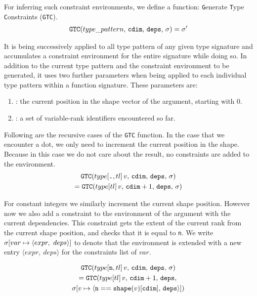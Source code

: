 \noindent
For inferring such constraint environments, we define a function: \texttt{G}enerate \texttt{T}ype \texttt{C}onstraints (\texttt{GTC}).
\begin{gather*}
    \texttt{GTC}(type\_pattern,\, \texttt{cdim},\, \texttt{deps},\, \sigma{}) = \sigma{}'
\end{gather*}

\noindent
It is being successively applied to all type pattern of any given type signature and accumulates a constraint environment \cenv{} for the entire signature
while doing so.
In addition to the current type pattern and the constraint environment to be generated,
it uses two further parameters when
being applied to each individual type pattern within a function signature.
These parameters are:
\begin{enumerate}
    \item \cdim{}: the current position in the shape vector of the argument, starting with 0.
    \item \deps{}: a set of variable-rank identifiers encountered so far.
\end{enumerate}

\noindent
Following are the recursive cases of the \texttt{GTC} function.
In the case that we encounter a dot, we only need to increment the current position in the shape.
Because in this case we do not care about the result, no constraints are added to the environment.
\begin{gather*}
    \texttt{GTC}(type[\texttt{\textbf{.}},tl]\,v,\,\texttt{cdim},\,\texttt{deps},\,\sigma{}) \\
        = \texttt{GTC}(type[tl]\,v,\,\texttt{cdim}+1,\,\texttt{deps},\,\sigma{})
\end{gather*}

\noindent
For constant integers \tpnum{} we similarly increment the current shape position.
However now we also add a constraint to the environment of the argument with the current dependencies.
This constraint gets the extent of the current rank from the current shape position, and checks that it is equal to \texttt{n}.
We write $\cenv[var \mapsto \langle{}expr,\ deps\rangle{}]$ to denote that the environment \cenv{} is extended with a new entry $\langle{}expr,\ deps\rangle{}$ for the constraints list of $var$.

{
\setlength\abovedisplayskip{0pt}
\begin{gather*}
    \texttt{GTC}(type[\texttt{n},tl]\,v,\,\texttt{cdim},\,\texttt{deps},\,\sigma{}) \\
        = \texttt{GTC}(type[tl]\,v,\,\texttt{cdim}+1,\,\texttt{deps},\, \\ \sigma{}
            [v\mapsto\langle{}\texttt{n} == \texttt{shape}(v)[\texttt{cdim}],\,\texttt{deps}\rangle{}])
\end{gather*}
}

